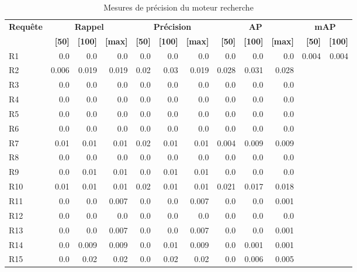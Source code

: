\begin{table}[H]
\centering
\begin{tabular}{l|rrr|rrr|rrr|rr}
\toprule
\textbf{Requête} & \multicolumn{3}{c}{\textbf{Rappel}} & \multicolumn{3}{c}{\textbf{Précision}} & \multicolumn{3}{c}{\textbf{AP}} & \multicolumn{2}{c}{\textbf{mAP}} \\
 & \textbf{[50]} & \textbf{[100]} & \textbf{[max]} & \textbf{[50]} & \textbf{[100]} & \textbf{[max]} & \textbf{[50]} & \textbf{[100]} & \textbf{[max]} & \textbf{[50]} & \textbf{[100]} \\
\midrule
R1 & 0.0 & 0.0 & 0.0 & 0.0 & 0.0 & 0.0 & 0.0 & 0.0 & 0.0 & \multirow{15}{*}{0.004} & \multirow{15}{*}{0.004} \\
R2 & 0.006 & 0.019 & 0.019 & 0.02 & 0.03 & 0.019 & 0.028 & 0.031 & 0.028 \\
R3 & 0.0 & 0.0 & 0.0 & 0.0 & 0.0 & 0.0 & 0.0 & 0.0 & 0.0 \\
R4 & 0.0 & 0.0 & 0.0 & 0.0 & 0.0 & 0.0 & 0.0 & 0.0 & 0.0 \\
R5 & 0.0 & 0.0 & 0.0 & 0.0 & 0.0 & 0.0 & 0.0 & 0.0 & 0.0 \\
R6 & 0.0 & 0.0 & 0.0 & 0.0 & 0.0 & 0.0 & 0.0 & 0.0 & 0.0 \\
R7 & 0.01 & 0.01 & 0.01 & 0.02 & 0.01 & 0.01 & 0.004 & 0.009 & 0.009 \\
R8 & 0.0 & 0.0 & 0.0 & 0.0 & 0.0 & 0.0 & 0.0 & 0.0 & 0.0 \\
R9 & 0.0 & 0.01 & 0.01 & 0.0 & 0.01 & 0.01 & 0.0 & 0.0 & 0.0 \\
R10 & 0.01 & 0.01 & 0.01 & 0.02 & 0.01 & 0.01 & 0.021 & 0.017 & 0.018 \\
R11 & 0.0 & 0.0 & 0.007 & 0.0 & 0.0 & 0.007 & 0.0 & 0.0 & 0.001 \\
R12 & 0.0 & 0.0 & 0.0 & 0.0 & 0.0 & 0.0 & 0.0 & 0.0 & 0.0 \\
R13 & 0.0 & 0.0 & 0.007 & 0.0 & 0.0 & 0.007 & 0.0 & 0.0 & 0.001 \\
R14 & 0.0 & 0.009 & 0.009 & 0.0 & 0.01 & 0.009 & 0.0 & 0.001 & 0.001 \\
R15 & 0.0 & 0.02 & 0.02 & 0.0 & 0.02 & 0.02 & 0.0 & 0.006 & 0.005 \\
\bottomrule
\end{tabular}
\caption{Mesures de précision du moteur recherche}
\label{tab:results}
\end{table}
